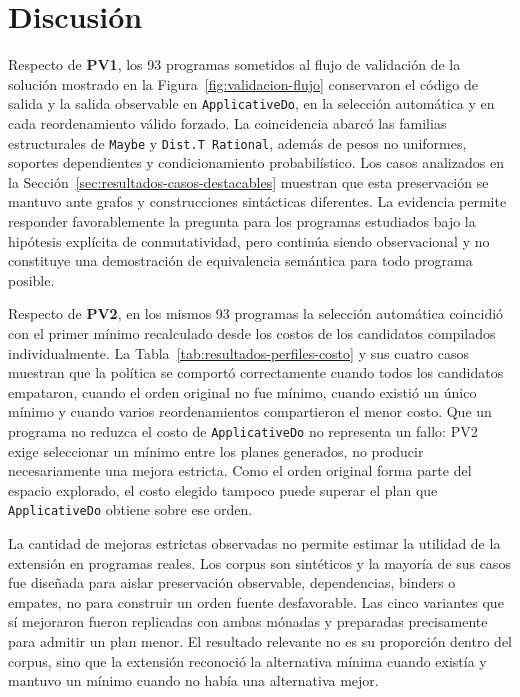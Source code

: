 
\section{Discusión}
\label{sec:resultados-discusion}

Respecto de \textbf{PV1}, los 93 programas sometidos al flujo de validación de la solución mostrado en la Figura~\ref{fig:validacion-flujo} conservaron el código de salida y la salida observable en \texttt{ApplicativeDo}, en la selección automática y en cada reordenamiento válido forzado. La coincidencia abarcó las familias estructurales de \texttt{Maybe} y \texttt{Dist.T Rational}, además de pesos no uniformes, soportes dependientes y condicionamiento probabilístico. Los casos analizados en la Sección~\ref{sec:resultados-casos-destacables} muestran que esta preservación se mantuvo ante grafos y construcciones sintácticas diferentes. La evidencia permite responder favorablemente la pregunta para los programas estudiados bajo la hipótesis explícita de conmutatividad, pero continúa siendo observacional y no constituye una demostración de equivalencia semántica para todo programa posible.

Respecto de \textbf{PV2}, en los mismos 93 programas la selección automática coincidió con el primer mínimo recalculado desde los costos de los candidatos compilados individualmente. La Tabla~\ref{tab:resultados-perfiles-costo} y sus cuatro casos muestran que la política se comportó correctamente cuando todos los candidatos empataron, cuando el orden original no fue mínimo, cuando existió un único mínimo y cuando varios reordenamientos compartieron el menor costo. Que un programa no reduzca el costo de \texttt{ApplicativeDo} no representa un fallo: PV2 exige seleccionar un mínimo entre los planes generados, no producir necesariamente una mejora estricta. Como el orden original forma parte del espacio explorado, el costo elegido tampoco puede superar el plan que \texttt{ApplicativeDo} obtiene sobre ese orden.

La cantidad de mejoras estrictas observadas no permite estimar la utilidad de la extensión en programas reales. Los corpus son sintéticos y la mayoría de sus casos fue diseñada para aislar preservación observable, dependencias, binders o empates, no para construir un orden fuente desfavorable. Las cinco variantes que sí mejoraron fueron replicadas con ambas mónadas y preparadas precisamente para admitir un plan menor. El resultado relevante no es su proporción dentro del corpus, sino que la extensión reconoció la alternativa mínima cuando existía y mantuvo un mínimo cuando no había una alternativa mejor.

